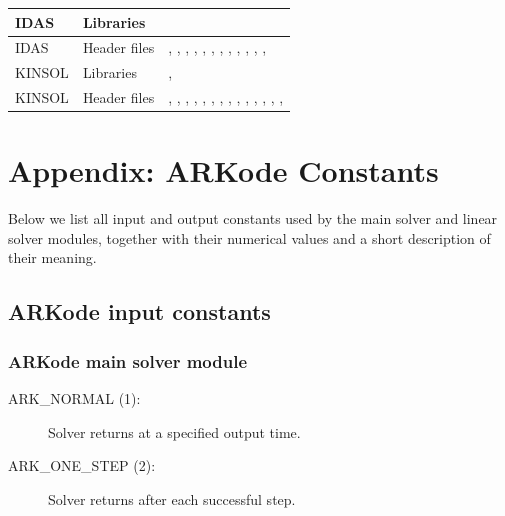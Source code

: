 \documentclass[letterpaper,10pt,english]{sphinxmanual}
\begin{document}
\begin{tabulary}{\linewidth}{|L|L|L|}
IDAS
 & 
Libraries
 & 
\\\hline

IDAS
 & 
Header files
 & 
,
,
,
,
,
,
,
,
,
,
,
,
\\\hline

KINSOL
 & 
Libraries
 & 
,
\\\hline

KINSOL
 & 
Header files
 & 
,
,
,
,
,
,
,
,
,
,
,
,
,
,
\\\hline
\end{tabulary}



\chapter{Appendix: ARKode Constants}
\label{Constants:appendix-arkode-constants}\label{Constants::doc}\label{Constants:constants}
Below we list all input and output constants used by the main solver
and linear solver modules, together with their numerical values and a
short description of their meaning.


\section{ARKode input constants}
\label{Constants:arkode-input-constants}

\subsection{ARKode main solver module}
\label{Constants:arkode-main-solver-module}\begin{description}
\item[{ARK\_NORMAL (1):}] \leavevmode
Solver returns at a specified output time.

\item[{ARK\_ONE\_STEP  (2):}] \leavevmode
Solver returns after each successful step.

\end{description}
\end{document}
